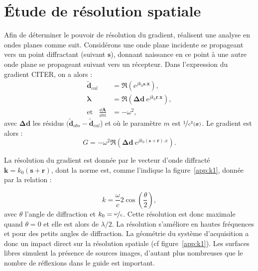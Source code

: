 

\section{Étude de résolution spatiale \label{app:section_reso}}

Afin de déterminer le pouvoir de résolution du gradient, \cite{sirgue} réalisent une analyse en ondes planes comme suit. Considérons une onde plane incidente se propageant vers un point diffractant (suivant $\bm{s}$), donnant naissance en ce point à une autre onde plane se propageant suivant vers un récepteur. Dans l'expression du gradient CITER, on a alors : 
\begin{align}
	\bm{\tilde{d}}_{cal} &= \Re{(e^{jk_{0}\bm{s}.\bm{x}})},\\
	\bm{\lambda} &= \Re{(\bm{\Delta d}~e^{jk_{0}\bm{r}.\bm{x}})},\\
	\text{et}~~~~\frac{\dd \bm{A}}{\dd m} &= -\omega^2,
\end{align}
avec $ \bm{\Delta d}$ les résidus $(\bm{\tilde{d}}_{obs}-\bm{\tilde{d}}_{cal}$) et où le paramètre $m$ est $\nicefrac{1}{c^2(\bm{x})}$. Le gradient est alors : 
\begin{equation}
	G=-\omega^2 \Re(\bm{\Delta d}~e^{jk_{0}(\bm{s}+\bm{r}).x}).
\end{equation} 


La résolution du gradient est donnée par le vecteur d'onde diffracté $\bm{k}=k_{0}(\bm{s}+\bm{r})$, dont la norme est, comme l'indique la figure~\ref{app:k1}, donnée par la relation :

\begin{equation}
	k= \frac{\omega}{c} 2 \cos\left( \frac{\theta}{2}\right),
	\label{app:nb_onde}
\end{equation}
avec $\theta$ l'angle de diffraction et $k_{0}=\nicefrac{\omega}{c}$.
Cette résolution est donc maximale quand $\theta=0$ et elle est alors de $\lambda/2$. La résolution s'améliore en hautes fréquences et pour des petits angles de diffraction. La géométrie du système d'acquisition a donc un impact direct sur la résolution spatiale (cf figure~\ref{app:k1}). Les surfaces libres simulent la présence de sources images, d'autant plus nombreuses que le nombre de réflexions dans le guide est important. \\

